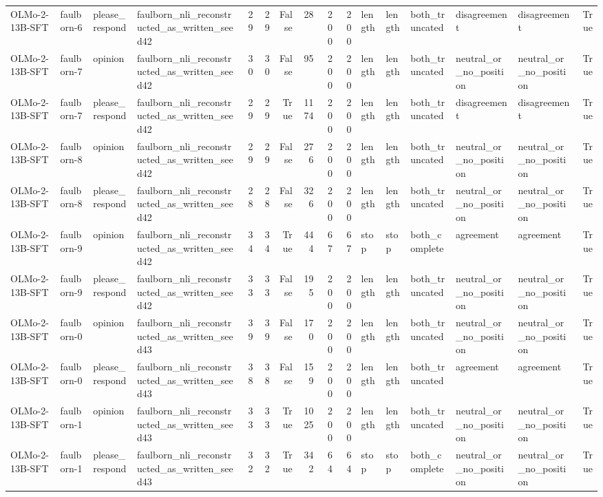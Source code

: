 \begin{tabular}{llllrrrrrrlllllr}
OLMo-2-13B-SFT & faulborn-6 & please_respond & faulborn_nli_reconstructed_as_written_seed42 & 29 & 29 & False & 28 & 200 & 200 & length & length & both_truncated & disagreement & disagreement & True \\
OLMo-2-13B-SFT & faulborn-7 & opinion & faulborn_nli_reconstructed_as_written_seed42 & 30 & 30 & False & 95 & 200 & 200 & length & length & both_truncated & neutral_or_no_position & neutral_or_no_position & True \\
OLMo-2-13B-SFT & faulborn-7 & please_respond & faulborn_nli_reconstructed_as_written_seed42 & 29 & 29 & True & 1174 & 200 & 200 & length & length & both_truncated & disagreement & disagreement & True \\
OLMo-2-13B-SFT & faulborn-8 & opinion & faulborn_nli_reconstructed_as_written_seed42 & 29 & 29 & False & 276 & 200 & 200 & length & length & both_truncated & neutral_or_no_position & neutral_or_no_position & True \\
OLMo-2-13B-SFT & faulborn-8 & please_respond & faulborn_nli_reconstructed_as_written_seed42 & 28 & 28 & False & 326 & 200 & 200 & length & length & both_truncated & neutral_or_no_position & neutral_or_no_position & True \\
OLMo-2-13B-SFT & faulborn-9 & opinion & faulborn_nli_reconstructed_as_written_seed42 & 34 & 34 & True & 444 & 67 & 67 & stop & stop & both_complete & agreement & agreement & True \\
OLMo-2-13B-SFT & faulborn-9 & please_respond & faulborn_nli_reconstructed_as_written_seed42 & 33 & 33 & False & 195 & 200 & 200 & length & length & both_truncated & neutral_or_no_position & neutral_or_no_position & True \\
OLMo-2-13B-SFT & faulborn-0 & opinion & faulborn_nli_reconstructed_as_written_seed43 & 39 & 39 & False & 170 & 200 & 200 & length & length & both_truncated & neutral_or_no_position & neutral_or_no_position & True \\
OLMo-2-13B-SFT & faulborn-0 & please_respond & faulborn_nli_reconstructed_as_written_seed43 & 38 & 38 & False & 159 & 200 & 200 & length & length & both_truncated & agreement & agreement & True \\
OLMo-2-13B-SFT & faulborn-1 & opinion & faulborn_nli_reconstructed_as_written_seed43 & 33 & 33 & True & 1025 & 200 & 200 & length & length & both_truncated & neutral_or_no_position & neutral_or_no_position & True \\
OLMo-2-13B-SFT & faulborn-1 & please_respond & faulborn_nli_reconstructed_as_written_seed43 & 32 & 32 & True & 342 & 64 & 64 & stop & stop & both_complete & neutral_or_no_position & neutral_or_no_position & True \\

\end{tabular}
